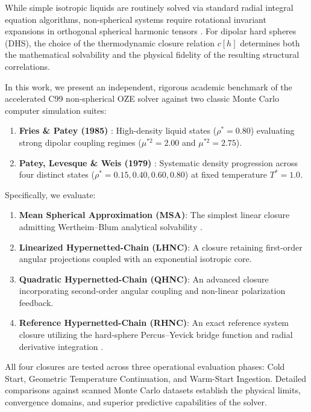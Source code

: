 \documentclass[11pt,a4paper]{article}
\begin{document}
While simple isotropic liquids are routinely solved via standard radial integral equation algorithms, non-spherical systems require rotational invariant expansions in orthogonal spherical harmonic tensors \cite{blum1972mean, blum1973mean}. For dipolar hard spheres (DHS), the choice of the thermodynamic closure relation $c[h]$ determines both the mathematical solvability and the physical fidelity of the resulting structural correlations.

In this work, we present an independent, rigorous academic benchmark of the accelerated C99 non-spherical OZE solver against two classic Monte Carlo computer simulation suites:
\begin{enumerate}
    \item \textbf{Fries \& Patey (1985)} \cite{fries1985solution}: High-density liquid states ($\rho^* = 0.80$) evaluating strong dipolar coupling regimes ($\mu^{*2} = 2.00$ and $\mu^{*2} = 2.75$).
    \item \textbf{Patey, Levesque \& Weis (1979)} \cite{patey1979monte}: Systematic density progression across four distinct states ($\rho^* = 0.15, 0.40, 0.60, 0.80$) at fixed temperature $T^* = 1.0$.
\end{enumerate}

Specifically, we evaluate:
\begin{enumerate}
    \item \textbf{Mean Spherical Approximation (MSA)}: The simplest linear closure admitting Wertheim--Blum analytical solvability \cite{wertheim1971exact, blum1972mean}.
    \item \textbf{Linearized Hypernetted-Chain (LHNC)}: A closure retaining first-order angular projections coupled with an exponential isotropic core.
    \item \textbf{Quadratic Hypernetted-Chain (QHNC)}: An advanced closure incorporating second-order angular coupling and non-linear polarization feedback.
    \item \textbf{Reference Hypernetted-Chain (RHNC)}: An exact reference system closure utilizing the hard-sphere Percus--Yevick bridge function and radial derivative integration \cite{fries1985solution, lado1982hypernetted}.
\end{enumerate}

All four closures are tested across three operational evaluation phases: Cold Start, Geometric Temperature Continuation, and Warm-Start Ingestion. Detailed comparisons against scanned Monte Carlo datasets establish the physical limits, convergence domains, and superior predictive capabilities of the solver.
\end{document}
